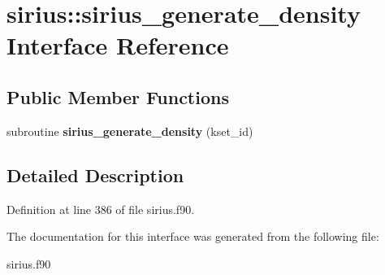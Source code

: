 \hypertarget{interfacesirius_1_1sirius__generate__density}{}\section{sirius\+:\+:sirius\+\_\+generate\+\_\+density Interface Reference}
\label{interfacesirius_1_1sirius__generate__density}
\subsection*{Public Member Functions}
\begin{DoxyCompactItemize}
\item 
\hypertarget{interfacesirius_1_1sirius__generate__density_a766b7c5e4838bd3792c476715f45557e}{}subroutine {\bfseries sirius\+\_\+generate\+\_\+density} (kset\+\_\+id)\label{interfacesirius_1_1sirius__generate__density_a766b7c5e4838bd3792c476715f45557e}

\end{DoxyCompactItemize}


\subsection{Detailed Description}


Definition at line 386 of file sirius.\+f90.



The documentation for this interface was generated from the following file\+:\begin{DoxyCompactItemize}
\item 
sirius.\+f90\end{DoxyCompactItemize}
